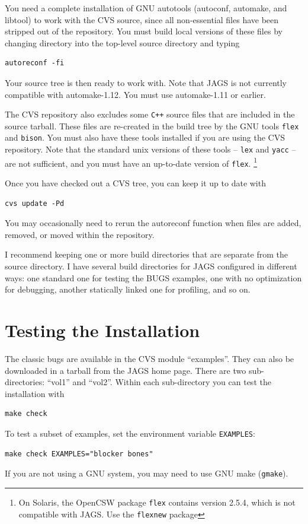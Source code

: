 \documentclass[11pt, a4paper, titlepage]{report}
\begin{document}
You need a complete installation of GNU autotools (autoconf, automake,
and libtool) to work with the CVS source, since all non-essential
files have been stripped out of the repository. You must build local
versions of these files by changing directory into the top-level
source directory and typing
\begin{verbatim}
autoreconf -fi
\end{verbatim}
Your source tree is then ready to work with.  Note that JAGS is not
currently compatible with automake-1.12.  You must use automake-1.11
or earlier.

The CVS repository also excludes some \texttt{C++} source files that
are included in the source tarball. These files are re-created in the
build tree by the GNU tools \verb+flex+ and \verb+bison+. You must
also have these tools installed if you are using the CVS
repository. Note that the standard unix versions of these tools --
\verb+lex+ and \verb+yacc+ -- are not sufficient, and you must have an
up-to-date version of \verb+flex+. \footnote{On Solaris, the OpenCSW
  package \texttt{flex} contains version 2.5.4, which is not compatible
  with JAGS. Use the \texttt{flexnew} package}

Once you have checked out a CVS tree, you can keep it up to date with
\begin{verbatim}
cvs update -Pd
\end{verbatim}
You may occasionally need to rerun the autoreconf function when files
are added, removed, or moved within the repository.

I recommend keeping one or more build directories that are separate
from the source directory. I have several build directories for JAGS
configured in different ways: one standard one for testing the BUGS
examples, one with no optimization for debugging, another statically
linked one for profiling, and so on.

\chapter{Testing the Installation}

The classic bugs are available in the CVS module ``examples''. They
can also be downloaded in a tarball from the JAGS home page. There are
two sub-directories: ``vol1'' and ``vol2''. Within each sub-directory
you can test the installation with
\begin{verbatim}
make check
\end{verbatim}
To test a subset of examples, set the environment variable \verb+EXAMPLES+:
\begin{verbatim}
make check EXAMPLES="blocker bones"
\end{verbatim}
If you are not using a GNU system, you may need to use GNU make
(\verb+gmake+).
\end{document}
